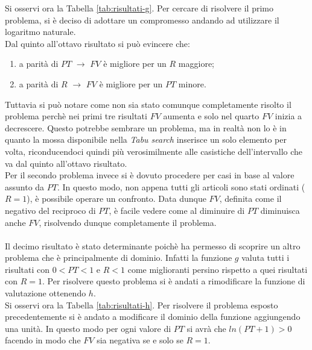 \noindent Si osservi ora la Tabella \ref{tab:risultati-g}.
Per cercare di risolvere il primo problema, si è deciso di
adottare un compromesso andando ad utilizzare il logaritmo naturale.\\
Dal quinto all'ottavo risultato si può evincere che:
\begin{enumerate}
    \item a parità di $PT$ $\rightarrow$ $FV$ è migliore per
    un $R$ maggiore;
    \item a parità di $R$ $\rightarrow$ $FV$ è migliore per
    un $PT$ minore.
\end{enumerate}
Tuttavia si può notare come non sia stato comunque completamente
risolto il problema perchè nei primi tre risultati
$FV$ aumenta e solo nel quarto $FV$ inizia a decrescere.
Questo potrebbe sembrare un problema, ma in realtà non lo è in
quanto la mossa disponibile nella \textit{Tabu search} inserisce
un solo elemento per volta, riconducendoci quindi
più verosimilmente alle casistiche dell'intervallo che va dal quinto all'ottavo risultato.\\

\noindent Per il secondo problema invece si è dovuto procedere per casi in
base al valore assunto da $PT$. In questo modo, non appena
tutti gli articoli sono stati ordinati ($R=1$), è possibile operare
un confronto.
Data dunque $FV$, definita come il negativo del reciproco di $PT$,
è facile vedere come al diminuire di $PT$ diminuisca anche $FV$,
risolvendo dunque completamente il problema.\\\\

\noindent Il decimo risultato è stato determinante poichè ha permesso di
scoprire un altro problema che è principalmente di dominio.
Infatti la funzione $g$ valuta tutti i risultati con $0 < PT < 1$
e $R<1$ come miglioranti persino rispetto a quei
risultati con $R=1$. Per risolvere questo problema si è andati
a rimodificare la funzione di valutazione ottenendo $h$.\\

\noindent Si osservi ora la Tabella \ref{tab:risultati-h}.
Per risolvere il problema esposto precedentemente si è andato
a modificare il dominio della funzione aggiungendo una unità.
In questo modo per ogni valore di $PT$ si avrà che
$ln(PT+1)>0$ facendo in modo che $FV$ sia negativa se e solo se
$R=1$.

